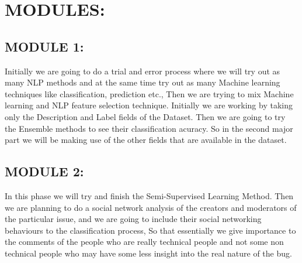 
\chapter{\uppercase{Modules:}} %
\label{chap5} %
\section{\uppercase{Module 1:}}
Initially we are going to do a trial and error process where we will try out as many NLP methods and at the same time try out as many Machine learning techniques like classification, prediction etc., Then we are trying to mix Machine learning and NLP feature selection technique. Initially we are working by taking only the Description and Label fields of the Dataset. Then we are going to try the Ensemble methods to see their classification acuracy. So in the second major part we will be making use of the other fields that are available in the dataset.

\section{\uppercase{Module 2:}}
In this phase we will try and finish the Semi-Supervised Learning Method. Then we are planning to do a social network analysis of the creators and moderators of the particular issue, and we are going to include their social networking behaviours to the classification process, So that essentially we give importance to the comments of the people who are really technical people and not some non technical people who may have some less insight into the real nature of the bug.